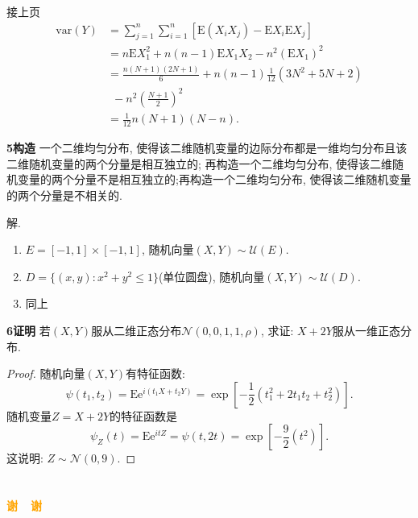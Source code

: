 \documentclass[aspectratio=43]{beamer}
\begin{document}
\begin{frame}
	\begin{block}{接上页}
		\begin{equation*}
		\begin{split}
			\mathrm{var}(Y) &= \sum_{j=1}^n\sum_{i=1}^n\left[ \mathrm{E}(X_iX_j) - \mathrm{E}X_i\mathrm{E}X_j \right]\\
			&= n\mathrm{E}X_1^2 + n(n-1)\mathrm{E}X_1X_2 - n^2(\mathrm{E}X_1)^2 \\
			&= \frac{n(N+1)(2N+1)}{6} + n(n-1)\frac{1}{12} \left(3 N^2+5N+2\right) \\
			&~~- n^2\left(\frac{N+1}{2}\right)^2\\
			&= \frac{1}{12} n (N+1) (N-n).
		\end{split}
		\end{equation*}
	\end{block}
\end{frame}

\begin{frame}{\textbf{5构造}}
	一个二维均匀分布, 使得该二维随机变量的边际分布都是一维均匀分布且该二维随机变量的两个分量是相互独立的; 再构造一个二维均匀分布, 使得该二维随机变量的两个分量不是相互独立的;再构造一个二维均匀分布, 使得该二维随机变量的两个分量是不相关的.
	\begin{block}{解.}
		\begin{enumerate}
			\item $E = [-1,1]\times [-1,1]$, 随机向量$(X,Y)\sim\mathcal{U}(E)$.
			\item $D = \{ (x,y): x^2+y^2\leqslant 1 \}$(单位圆盘), 随机向量$(X,Y)\sim\mathcal{U}(D)$.
			\item 同上
		\end{enumerate}
	\end{block}
\end{frame}

\begin{frame}{\textbf{6证明}}
	若$(X,Y)$服从二维正态分布$\mathcal{N}(0,0,1,1,\rho)$, 求证: $X+2Y$服从一维正态分布.
	\begin{proof}
		随机向量$(X,Y)$有特征函数:
		\begin{equation*}
			\psi(t_1,t_2) = \mathrm{E}\mathrm{e}^{i(t_1X+t_2Y)} = 
			\exp\left[ -\frac{1}{2}(t_1^2+2t_1t_2+t_2^2) \right].
		\end{equation*}
		随机变量$Z = X+2Y$的特征函数是\begin{equation*}
			\psi_Z(t) = \mathrm{E}\mathrm{e}^{itZ} = \psi(t,2t) = \exp\left[ -\frac{9}{2}(t^2) \right].
		\end{equation*}
		这说明: $Z\sim\mathcal{N}(0,9)$.
	\end{proof}
\end{frame}


\section{}
\begin{frame}{}
\centering
\Huge\bfseries
\textcolor{orange}{谢~~谢}
\end{frame}
\end{document}
